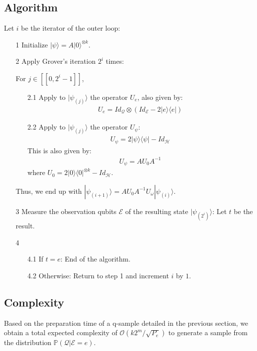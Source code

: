 \subsection{Algorithm}

Let $i$ be the iterator of the outer loop:
\begin{itemize}
    \item[1] Initialize $|\psi \rangle = A|0\rangle^{\otimes k}$.
    \item[2] Apply Grover's iteration $2^i$ times:
    \item[] For $j \in [\![0, 2^i-1]\!]$,
    \begin{itemize}
  	 
   	 \item[2.1] Apply to $|\psi_{(j)}\rangle$ the operator $U_{e}$, also given by:
   	 \begin{align*}
   	 U_{e} = Id_{\mathcal{Q}} \otimes (Id_{\mathcal{E}} -  2|e \rangle \langle e| )
   	 \end{align*}
   	 \item[2.2] Apply to $|\psi_{(j)}\rangle$ the operator $U_{\psi}$:
    	\begin{align*}
   	 U_{\psi} = 2|\psi\rangle \langle \psi | - Id_{\mathcal{H}}
   	 \end{align*}
    	This is also given by:
    	\begin{align*}
    	U_{\psi} = AU_{0}A^{-1}
   	 \end{align*}
    	where $U_{0} = 2|0\rangle \langle 0|^{\otimes k} - Id_{\mathcal{H}}$.
   	 
    \end{itemize}
    \item[] Thus, we end up with $|\psi_{(i+1)}\rangle = AU_{0}A^{-1}U_{\omega} |\psi_{(i)} \rangle$.
    \item[3] Measure the observation qubits $\mathcal{E}$ of the resulting state $|\psi_{(2^i)} \rangle$: Let $t$ be the result.
	\item[4]
	\begin{itemize}
   	 \item[4.1] If $t=e$: End of the algorithm.
   	 \item[4.2] Otherwise: Return to step 1 and increment $i$ by $1$.
    \end{itemize}
\end{itemize}

\subsection{Complexity}

Based on the preparation time of a q-sample detailed in the previous section, we obtain a total expected complexity of $\mathcal{O}(k2^m/\sqrt{P_e})$ to generate a sample from the distribution $\mathbb{P}(\mathcal{Q}|\mathcal{E}=e)$.
